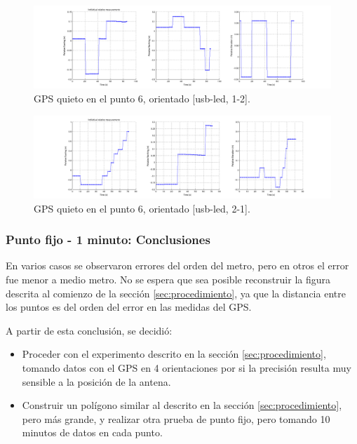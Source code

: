 \documentclass[spanish,12pt,a4paper,titlepage]{report}
\begin{document}
\begin{figure}[h!]
  \hspace{-70pt}
  \includegraphics[width=1.3\textwidth]{./img/log_06_individual.png}
  \caption{GPS quieto en el punto 6, orientado [usb-led, 1-2].}
  \label{fig:log_06_individual.png}
\end{figure}

\newpage

\begin{figure}[h!]
  \hspace{-70pt}
  \includegraphics[width=1.3\textwidth]{./img/log_05_individual.png}
  \caption{GPS quieto en el punto 6, orientado [usb-led, 2-1].}
  \label{fig:log_05_individual.png}
\end{figure}

\subsubsection{Punto fijo - 1 minuto: Conclusiones}
\label{sec:punto-fijo-conclusiones}

En varios casos se observaron errores del orden del metro, pero en otros el error fue menor a medio metro. No se espera que sea posible reconstruir la figura descrita al comienzo de la sección \ref{sec:procedimiento}, ya que la distancia entre los puntos es del orden del error en las medidas del GPS.

A partir de esta conclusión, se decidió:
\begin{itemize}
\item Proceder con el experimento descrito en la sección \ref{sec:procedimiento}, tomando datos con el GPS en 4 orientaciones por si la precisión resulta muy sensible a la posición de la antena.
\item Construir un polígono similar al descrito en la sección \ref{sec:procedimiento}, pero más grande, y realizar otra prueba de punto fijo, pero tomando 10 minutos de datos en cada punto.
\end{itemize}
\end{document}
